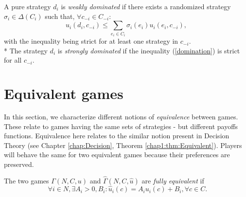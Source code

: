 \begin{definition}
A pure strategy $d_i$ is \emph{weakly dominated} if there exists a randomized strategy $\sigma_i \in \Delta(C_i)$ such that, $\forall c_{-i} \in C_{-i}$:
\begin{equation}
 u_i(d_i, c_{-i}) \leq \sum_{e_i \in C_i} \sigma_i(e_i) u_i(e_i, c_{-i}), 
 \label{domination}
\end{equation}
with the inequality being strict for at least one strategy in $c_{-i}$.\\*
The strategy $d_i$ is \emph{strongly dominated} if the inequality (\ref{domination}) is strict for all $c_{-i}$.
\label{defdomipayoffs}
 \end{definition}


\section{Equivalent games}
\label{chap2:subsec:Equivalences}

In this section, we characterize different notions of \emph{equivalence} between games. These relate to games having the same sets of strategies - but different payoffs functions. Equivalence here relates to the similar notion present in Decision Theory (see Chapter \ref{chap:Decision}, Theorem \ref{chap1:thm:Equivalent}). Players will behave the same for two equivalent games because their preferences are preserved.\\

\begin{definition}
The two games $\Gamma(N, C, u)$ and $\hat \Gamma(N,C,\hat{u})$ are \emph{fully equivalent} if
$$\,\,\forall i \in N, \exists A_i > 0, B_i : \hat u_i(c) = A_i u_i(c) + B_i, \forall c \in C.$$
\label{chap2:def:fullEquivalence}
\end{definition} 

